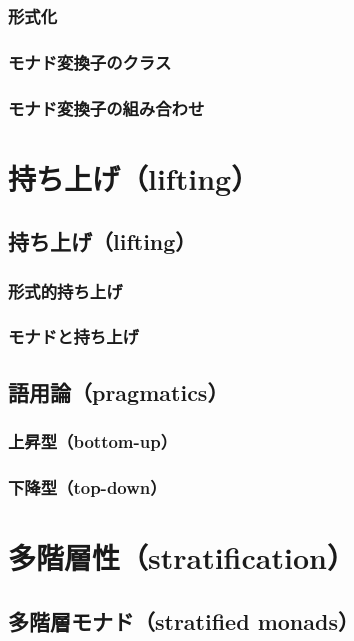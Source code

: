 \documentclass[11pt, oneside]{jsarticle}   	%
\begin{document}


\subsubsection{  形式化 }
\subsubsection{ モナド変換子のクラス }
\subsubsection{ モナド変換子の組み合わせ }

\newpage
\section{ 持ち上げ（lifting）}
\subsection{ 持ち上げ（lifting） }
\subsubsection{  形式的持ち上げ }
\subsubsection{ モナドと持ち上げ }
\subsection{ 語用論（pragmatics） }
\subsubsection{ 上昇型（bottom-up） }
\subsubsection{ 下降型（top-down） }

\newpage
\section{ 多階層性（stratification）}
\subsection{ 多階層モナド（stratified monads） }
\end{document}
